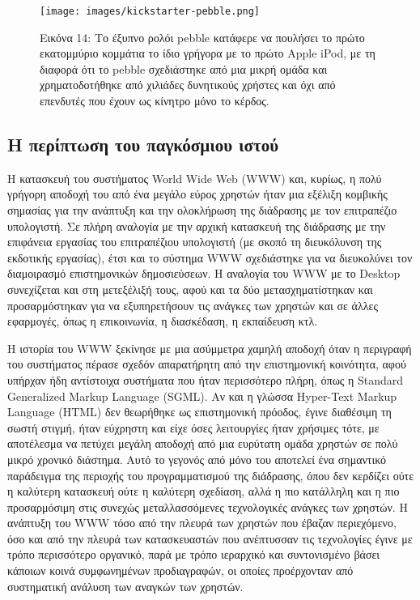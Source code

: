 \documentclass[
]{article}
\begin{document}
\leavevmode{}%
\begin{figure}
\hypertarget{fig:kickstarter-pebble}{%
\centering
\texttt{[image: images/kickstarter-pebble.png]}
\caption{Εικόνα 14: Το έξυπνο ρολόι pebble κατάφερε να πουλήσει το πρώτο
εκατομμύριο κομμάτια το ίδιο γρήγορα με το πρώτο Apple iPod, με τη
διαφορά ότι το pebble σχεδιάστηκε από μια μικρή ομάδα και
χρηματοδοτήθηκε από χιλιάδες δυνητικούς χρήστες και όχι από επενδυτές
που έχουν ως κίνητρο μόνο το κέρδος.}\label{fig:kickstarter-pebble}
}
\end{figure}

\hypertarget{ux3b7-ux3c0ux3b5ux3c1ux3afux3c0ux3c4ux3c9ux3c3ux3b7-ux3c4ux3bfux3c5-ux3c0ux3b1ux3b3ux3baux3ccux3c3ux3bcux3b9ux3bfux3c5-ux3b9ux3c3ux3c4ux3bfux3cd}{%
\subsection{Η περίπτωση του παγκόσμιου
ιστού}\label{ux3b7-ux3c0ux3b5ux3c1ux3afux3c0ux3c4ux3c9ux3c3ux3b7-ux3c4ux3bfux3c5-ux3c0ux3b1ux3b3ux3baux3ccux3c3ux3bcux3b9ux3bfux3c5-ux3b9ux3c3ux3c4ux3bfux3cd}}

Η κατασκευή του συστήματος World Wide Web (WWW) και, κυρίως, η πολύ
γρήγορη αποδοχή του από ένα μεγάλο εύρος χρηστών ήταν μια εξέλιξη
κομβικής σημασίας για την ανάπτυξη και την ολοκλήρωση της διάδρασης με
τον επιτραπέζιο υπολογιστή. Σε πλήρη αναλογία με την αρχική κατασκευή
της διάδρασης με την επιφάνεια εργασίας του επιτραπέζιου υπολογιστή (με
σκοπό τη διευκόλυνση της εκδοτικής εργασίας), έτσι και το σύστημα WWW
σχεδιάστηκε για να διευκολύνει τον διαμοιρασμό επιστημονικών
δημοσιεύσεων. Η αναλογία του WWW με το Desktop συνεχίζεται και στη
μετεξέλιξή τους, αφού και τα δύο μετασχηματίστηκαν και προσαρμόστηκαν
για να εξυπηρετήσουν τις ανάγκες των χρηστών και σε άλλες εφαρμογές,
όπως η επικοινωνία, η διασκέδαση, η εκπαίδευση κτλ.

Η ιστορία του WWW ξεκίνησε με μια ασύμμετρα χαμηλή αποδοχή όταν η
περιγραφή του συστήματος πέρασε σχεδόν απαρατήρητη από την επιστημονική
κοινότητα, αφού υπήρχαν ήδη αντίστοιχα συστήματα που ήταν περισσότερο
πλήρη, όπως η Standard Generalized Markup Language (SGML). Αν και η
γλώσσα Hyper-Text Markup Language (HTML) δεν θεωρήθηκε ως επιστημονική
πρόοδος, έγινε διαθέσιμη τη σωστή στιγμή, ήταν εύχρηστη και είχε όσες
λειτουργίες ήταν χρήσιμες τότε, με αποτέλεσμα να πετύχει μεγάλη αποδοχή
από μια ευρύτατη ομάδα χρηστών σε πολύ μικρό χρονικό διάστημα. Αυτό το
γεγονός από μόνο του αποτελεί ένα σημαντικό παράδειγμα της περιοχής του
προγραμματισμού της διάδρασης, όπου δεν κερδίζει ούτε η καλύτερη
κατασκευή ούτε η καλύτερη σχεδίαση, αλλά η πιο κατάλληλη και η πιο
προσαρμόσιμη στις συνεχώς μεταλλασσόμενες τεχνολογικές ανάγκες των
χρηστών. Η ανάπτυξη του WWW τόσο από την πλευρά των χρηστών που έβαζαν
περιεχόμενο, όσο και από την πλευρά των κατασκευαστών που ανέπτυσσαν τις
τεχνολογίες έγινε με τρόπο περισσότερο οργανικό, παρά με τρόπο ιεραρχικό
και συντονισμένο βάσει κάποιων κοινά συμφωνημένων προδιαγραφών, οι
οποίες προέρχονταν από συστηματική ανάλυση των αναγκών των χρηστών.
\end{document}
